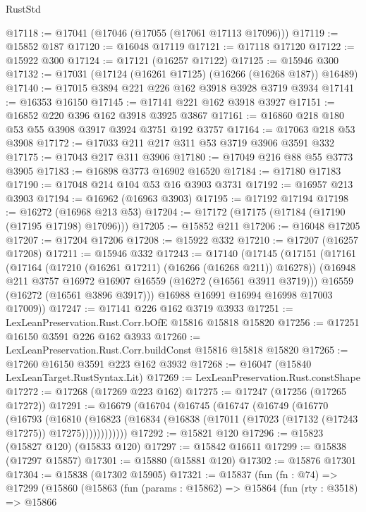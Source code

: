 \begin{lexlean}{RustStd}
\begin{coremodule}
@17118 := @17041 (@17046 (@17055 (@17061 @17113 @17096)))
@17119 := @15852 @187
@17120 := @16048 @17119
@17121 := @17118 @17120
@17122 := @15922 @300
@17124 := @17121 (@16257 @17122)
@17125 := @15946 @300
@17132 := @17031 (@17124 (@16261 @17125) (@16266 (@16268 @187)) @16489)
@17140 := @17015 @3894 @221 @226 @162 @3918 @3928 @3719 @3934
@17141 := @16353 @16150
@17145 := @17141 @221 @162 @3918 @3927
@17151 := @16852 @220 @396 @162 @3918 @3925 @3867
@17161 := @16860 @218 @180 @53 @55 @3908 @3917 @3924 @3751 @192 @3757
@17164 := @17063 @218 @53 @3908
@17172 := @17033 @211 @217 @311 @53 @3719 @3906 @3591 @332
@17175 := @17043 @217 @311 @3906
@17180 := @17049 @216 @88 @55 @3773 @3905
@17183 := @16898 @3773 @16902 @16520
@17184 := @17180 @17183
@17190 := @17048 @214 @104 @53 @16 @3903 @3731
@17192 := @16957 @213 @3903
@17194 := @16962 (@16963 @3903)
@17195 := @17192 @17194
@17198 := @16272 (@16968 @213 @53)
@17204 := @17172 (@17175 (@17184 (@17190 (@17195 @17198) @17096)))
@17205 := @15852 @211
@17206 := @16048 @17205
@17207 := @17204 @17206
@17208 := @15922 @332
@17210 := @17207 (@16257 @17208)
@17211 := @15946 @332
@17243 := @17140
    (@17145
      (@17151
        (@17161
          (@17164 (@17210 (@16261 @17211) (@16266 (@16268 @211)) @16278))
          (@16948 @211 @3757 @16972 @16907 @16559 (@16272 (@16561 @3911 @3719)))
          @16559
          (@16272 (@16561 @3896 @3917)))
        @16988
        @16991
        @16994
        @16998
        @17003
        @17009))
@17247 := @17141 @226 @162 @3719 @3933
@17251 := LexLeanPreservation.Rust.Corr.bOfE @15816 @15818 @15820
@17256 := @17251 @16150 @3591 @226 @162 @3933
@17260 := LexLeanPreservation.Rust.Corr.buildConst @15816 @15818 @15820
@17265 := @17260 @16150 @3591 @223 @162 @3932
@17268 := @16047 (@15840 LexLeanTarget.RustSyntax.Lit)
@17269 := LexLeanPreservation.Rust.constShape
@17272 := @17268 (@17269 @223 @162)
@17275 := @17247 (@17256 (@17265 @17272))
@17291 := @16679
    (@16704
      (@16745
        (@16747
          (@16749
            (@16770
              (@16793
                (@16810
                  (@16823
                    (@16834 (@16838 (@17011 (@17023 (@17132 (@17243 @17275)) @17275))))))))))))
@17292 := @15821 @120
@17296 := @15823 (@15827 @120) (@15833 @120)
@17297 := @15842 @16611
@17299 := @15838 (@17297 @15857)
@17301 := @15880 (@15881 @120)
@17302 := @15876 @17301
@17304 := @15838 (@17302 @15905)
@17321 := @15837
    (fun (fn : @74) =>
    @17299
      (@15860
        (@15863
          (fun (params : @15862) =>
          @15864
            (fun (rty : @3518) =>
            @15866

\end{coremodule}
\end{lexlean}
